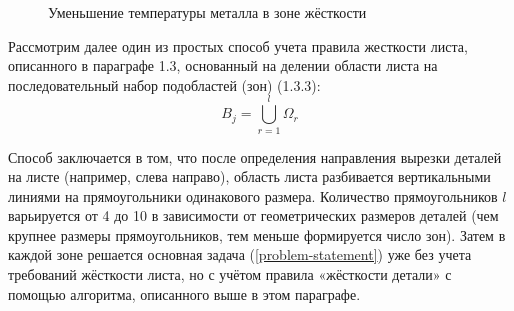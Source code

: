\documentclass[12pt]{report}
\newcounter{lem}
\begin{document}
\begin{figure}
  \centering
  \caption{Уменьшение температуры металла в зоне жёсткости }
  \label{thermal-550-130}
\end{figure}



Рассмотрим далее один из простых способ учета правила жесткости листа,
описанного в параграфе 1.3,
основанный на делении области листа на
последовательный набор подобластей (зон) (1.3.3):
$$
B_j =
\bigcup_{r=1}^l \Omega_r
$$

Способ заключается в том,
что после определения направления вырезки деталей на листе
(например, слева направо),
область листа разбивается вертикальными линиями
на прямоугольники одинакового размера.
Количество прямоугольников $l$
варьируется от 4 до 10 в зависимости от
геометрических размеров деталей
(чем крупнее размеры прямоугольников,
тем меньше формируется число зон).
Затем в каждой зоне решается основная задача (\ref{problem-statement})
уже без учета требований жёсткости листа,
но с учётом правила «жёсткости детали»
с помощью  алгоритма, описанного выше в этом параграфе.
\end{document}
